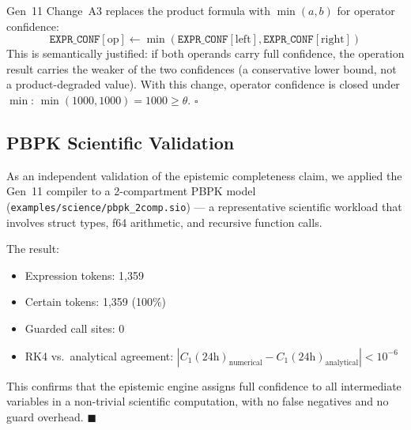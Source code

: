 Gen~11 Change~A3 replaces the product formula with $\min(a, b)$ for operator
confidence:
\[
  \mathtt{EXPR\_CONF}[\text{op}] \leftarrow \min(\mathtt{EXPR\_CONF}[\text{left}], \mathtt{EXPR\_CONF}[\text{right}])
\]
This is semantically justified: if both operands carry full confidence, the
operation result carries the weaker of the two confidences (a conservative
lower bound, not a product-degraded value).
With this change, operator confidence is closed under $\min$:
$\min(1000, 1000) = 1000 \geq \theta$. $\square$

\subsection*{PBPK Scientific Validation}

As an independent validation of the epistemic completeness claim,
we applied the Gen~11 compiler to a 2-compartment PBPK model
(\texttt{examples/science/pbpk\_2comp.sio}) — a representative
scientific workload that involves struct types, f64 arithmetic,
and recursive function calls.

The result:
\begin{itemize}
\item Expression tokens: 1,359
\item Certain tokens: 1,359 (100\%)
\item Guarded call sites: 0
\item RK4 vs.\ analytical agreement: $|C_1(24\text{h})_{\text{numerical}} - C_1(24\text{h})_{\text{analytical}}| < 10^{-6}$
\end{itemize}

This confirms that the epistemic engine assigns full confidence to all
intermediate variables in a non-trivial scientific computation,
with no false negatives and no guard overhead. $\blacksquare$
